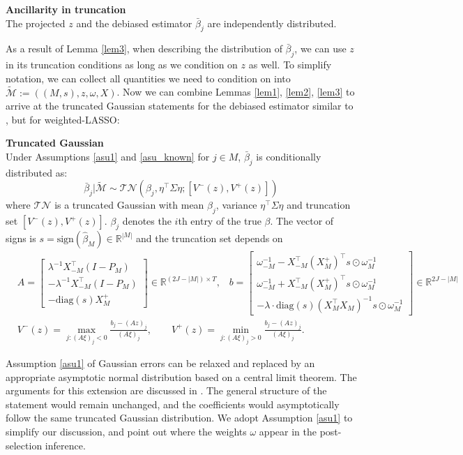 \documentclass[11pt]{article}
\newcommand{\sgn}{\textrm{sign}}
\newcommand{\RR}{\mathbb{R}}
\begin{document}
\begin{lemma_app}{\bf Ancillarity in truncation}\label{lem3}\\
	The projected $z$ and the debiased estimator $\bar{\beta}_j$ are independently distributed.
\end{lemma_app}

As a result of Lemma \ref{lem3}, when describing the distribution of $\bar{\beta}_j$, we can use $z$ in its truncation conditions as long as we condition on $z$ as well. To simplify notation, we can collect all quantities we need to condition on into $\tilde{\mathcal{M}}:=((M,s),z,\omega, X)$. Now we can combine Lemmas \ref{lem1}, \ref{lem2}, \ref{lem3} to arrive at the truncated Gaussian statements for the debiased estimator similar to \cite{lee2016exact}, but for weighted-LASSO: 


\begin{theorem_app}{\bf Truncated Gaussian}\label{thm1}\\
	Under Assumptions \ref{asu1} and \ref{asu_known} for $j\in M$,  $\bar{\beta}_{j}$ is conditionally distributed as:
	\begin{equation}
		\bar{\beta}_{j}|\tilde{\mathcal{M}}			\sim \mathcal{TN}(\beta_{j},\eta^\top \Sigma\eta;[V^{-}(z),V^{+}(z)])
	\end{equation}
	where $\mathcal{TN}$ is a truncated Gaussian with mean $\beta_{j}$, variance $\eta^\top \Sigma\eta$ and truncation set $[V^{-}(z),V^{+}(z)]$. $\beta_{j}$ denotes the $i$th entry of the true $\beta$. The vector of signs is $s=\sgn(\hat{\beta}_M)\in\RR^{|M|}$ and the truncation set depends on
	\begin{align*}
		&A=\begin{bmatrix}
			\lambda^{-1}X_{-M}^\top (I-P_M)\\
			-\lambda^{-1}X_{-M}^\top (I-P_M)\\
			-\text{diag}(s)X_M^+
		\end{bmatrix}\in\RR^{(2J-|M|)\times T},  
		\;\;\;  b=\begin{bmatrix}
			\omega_{-M}^{-1}-X_{-M}^\top(X_M^+)^\top s\odot\omega^{-1}_M\\
			\omega_{-M}^{-1}+X_{-M}^\top(X_M^+)^\top s\odot\omega^{-1}_M\\
			-\lambda\cdot \text{diag}(s)(X_M^\top X_M)^{-1}s\odot\omega^{-1}_M
		\end{bmatrix}\in\RR^{2J-|M|} \\
		&V^{-}(z)=\max_{j:(A\xi)_j<0}\frac{b_j-(Az)_j}{(A\xi)_j}, \qquad
		V^{+}(z)=\min_{j:(A\xi)_j>0}\frac{b_j-(Az)_j}{(A\xi)_j}.
	\end{align*}	
\end{theorem_app}
Assumption \ref{asu1} of Gaussian errors can be relaxed and replaced by an appropriate asymptotic normal distribution based on a central limit theorem. The arguments for this extension are discussed in \cite{tian2017asymptotics}. The general structure of the statement would remain unchanged, and the coefficients would asymptotically follow the same truncated Gaussian distribution. We adopt Assumption \ref{asu1} to simplify our discussion, and point out where the weights $\omega$ appear in the post-selection inference.      
\end{document}
